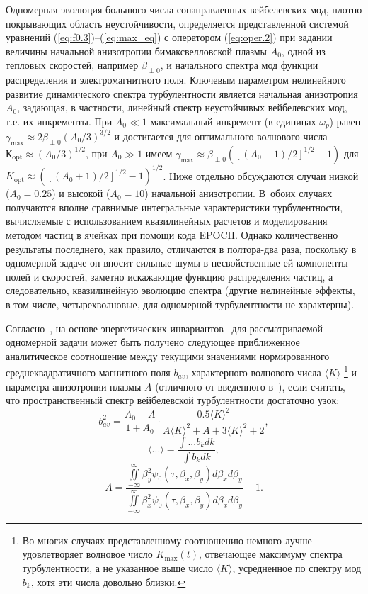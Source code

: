 Одномерная эволюция большого числа сонаправленных вейбелевских мод, плотно покрывающих область неустойчивости, определяется представленной системой уравнений (\ref{eq:f0.3})--(\ref{eq:max_eq}) с оператором (\ref{eq:oper.2}) при задании величины начальной анизотропии бимаксвелловской плазмы $A_0$, одной из тепловых скоростей, например $\beta_{\perp0}$, и начального спектра мод функции распределения и электромагнитного поля. Ключевым параметром нелинейного развитие динамического спектра турбулентности является начальная анизотропия $A_0$, задающая, в частности, линейный спектр неустойчивых вейбелевских мод, т.е. их инкременты. При $A_0\ll1$ максимальный инкремент (в единицах $\omega_p$) равен $\gamma_\mathrm{max}\approx 2 \beta_{\perp0} (A_0 / 3)^{3/2}$ и достигается для оптимального волнового числа $К_\mathrm{opt} \approx (A_0 / 3)^{1/2}$, при $A_0 \gg 1$ имеем $\gamma_\mathrm{max} \approx \beta_{\perp0} \left( \left[ (A_0+1)/2 \right]^{1/2} - 1 \right)$ для $K_\mathrm{opt} \approx \left( \left[ (A_0+1)/2 \right]^{1/2} - 1 \right)^{1/2}$. Ниже отдельно обсуждаются случаи низкой ($A_0 = 0.25$) и высокой ($A_0 = 10$) начальной анизотропии. В~обоих случаях получаются вполне сравнимые интегральные характеристики турбулентности, вычисляемые с использованием квазилинейных расчетов и моделирования методом частиц в ячейках при помощи кода EPOCH. Однако количественно результаты последнего, как правило, отличаются в полтора-два раза, поскольку в одномерной задаче он вносит сильные шумы в несвойственные ей компоненты полей и скоростей, заметно искажающие функцию распределения частиц, а следовательно, квазилинейную эволюцию спектра (другие нелинейные эффекты, в том числе, четырехволновые, для одномерной турбулентности не характерны).
 

Согласно~\cite{Nechaev2023}, на основе энергетических инвариантов~\cite{Davidson1972} для рассматриваемой одномерной задачи может быть получено следующее приближенное аналитическое соотношение между текущими значениями нормированного среднеквадратичного магнитного поля $b_{av}$, характерного волнового числа $\langle K\rangle$ \footnote{Во многих случаях представленному соотношению немного лучше удовлетворяет волновое число $K_\mathrm{max}(t)$, отвечающее максимуму спектра турбулентности, а не указанное выше число $\langle K\rangle$, усредненное
по спектру мод $b_{k}$, хотя эти числа довольно близки.} и параметра анизотропии плазмы $A$ (отличного от введенного в~\cite{Nechaev2023}), если считать, что пространственный спектр вейбелевской турбулентности достаточно узок:
\begin{equation}
\label{eq:otsenka}
b_{av}^2 = \frac{A_0-A}{1+A_0} \cdot \dfrac{0.5\langle K\rangle^2}{A \langle K\rangle^2 + A + 3 \langle K\rangle^2 + 2},
\end{equation}
\begin{equation}
\label{eq:angles}
\langle...\rangle=\frac{\int...b_k dk}{\int b_k dk} ,
\end{equation}
\begin{equation}
\label{eq:A_1d}
A=\frac{\iint\limits^{\infty}_{-\infty}\beta_y^2\psi_{0}(\tau,\beta_x,\beta_y) d\beta_x d\beta_y}{\iint\limits^{\infty}_{-\infty}\beta_x^2\psi_{0}(\tau,\beta_x,\beta_y) d\beta_x d\beta_y}-1 .
\end{equation}

